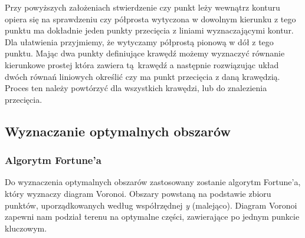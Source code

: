 \documentclass[a4paper,11pt]{article}
\begin{document}
Przy powyższych założeniach stwierdzenie czy punkt leży wewnątrz konturu opiera się na sprawdzeniu czy półprosta wytyczona w dowolnym kierunku z tego punktu ma dokładnie jeden punkty przecięcia z liniami wyznaczającymi kontur. Dla ułatwienia przyjmiemy, że wytyczamy półprostą pionową w dół z tego punktu. Mając dwa punkty definiujące krawędź możemy wyznaczyć równanie kierunkowe prostej która zawiera tą~krawędź a następnie rozwiązując układ dwóch równań liniowych określić czy ma punkt przecięcia z daną krawędzią. Proces ten należy powtórzyć dla wszystkich krawędzi, lub do znalezienia przecięcia.
 
\subsection{Wyznaczanie optymalnych obszarów}
\subsubsection{Algorytm Fortune'a}
Do wyznaczenia optymalnych obszarów zastosowany zostanie algorytm Fortune'a, który wyznaczy diagram Voronoi. Obszary powstaną na podstawie zbioru punktów, uporządkowanych według współrzędnej \textit{y} (malejąco). Diagram Voronoi zapewni nam podział terenu na optymalne części, zawierające po jednym punkcie kluczowym.
\end{document}
